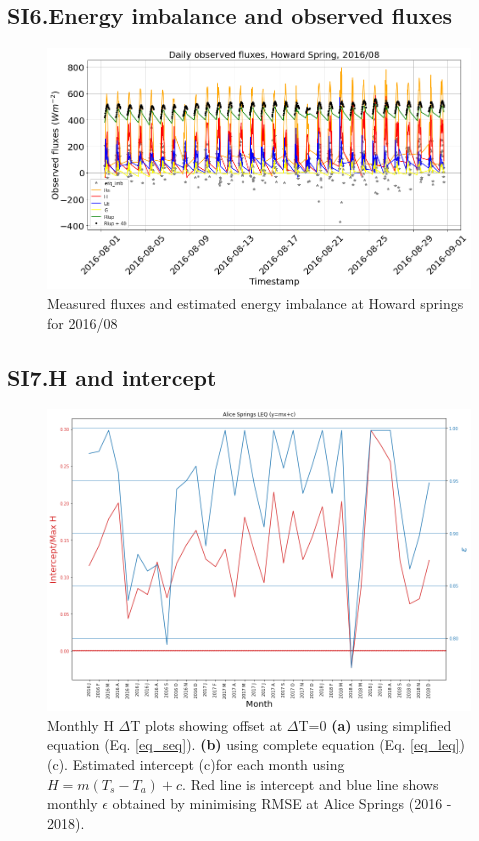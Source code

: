 \documentclass[fleqn,10pt]{wlscirep}
\begin{document}
\subsection*{SI6.Energy imbalance and observed fluxes}
\label{Subsection:wnimb}
\begin{figure}[h!]
  \includegraphics[scale=0.5]{hs_enb.png}
  \caption{Measured fluxes and estimated energy imbalance at Howard springs for 2016/08}
  \label{fig:wninb}
  \end{figure}

\subsection*{SI7.H and intercept}
\label{Subsection:intercept}
\begin{figure}[h!]
  \includegraphics[scale=0.5]{Plots/as_mx+c.png}
  \caption{Monthly H $\Delta$T plots showing offset at $\Delta$T=0 \textbf{(a)} using simplified equation (Eq. \ref{eq_seq}). \textbf {(b)} using complete equation (Eq. \ref{eq_leq})(c). Estimated intercept (c)for each month using $H = m (T_{s} - T_{a})+ c$. Red line is intercept and blue line shows monthly $\epsilon$ obtained by minimising RMSE at Alice Springs (2016 - 2018).}
  \label{fig:yr_intrc}
  \end{figure}

\end{document}
